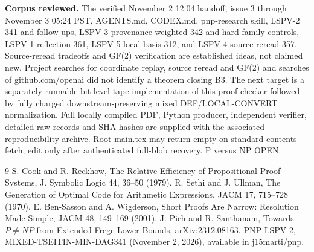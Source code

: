 \documentclass[11pt]{article}
\begin{document}
\noindent\textbf{Corpus reviewed.} The verified November 2 12:04 handoff, issue 3 through November 3 05:24 PST, AGENTS.md, CODEX.md, pnp-research skill, LSPV-2 341 and follow-ups, LSPV-3 provenance-weighted 342 and hard-family controls, LSPV-1 reflection 361, LSPV-5 local basis 312, and LSPV-4 source reread 357. Source-reread tradeoffs and GF(2) verification are established ideas, not claimed new. Project searches for coordinate replay, source reread and GF(2) and searches of github.com/openai did not identify a theorem closing B3. The next target is a separately runnable bit-level tape implementation of this proof checker followed by fully charged downstream-preserving mixed DEF/LOCAL-CONVERT normalization. Full locally compiled PDF, Python producer, independent verifier, detailed raw records and SHA hashes are supplied with the associated reproducibility archive. Root main.tex may return empty on standard contents fetch; edit only after authenticated full-blob recovery. P versus NP OPEN.

\begin{thebibliography}{9}
 S. Cook and R. Reckhow, The Relative Efficiency of Propositional Proof Systems, J. Symbolic Logic 44, 36--50 (1979).
 R. Sethi and J. Ullman, The Generation of Optimal Code for Arithmetic Expressions, JACM 17, 715--728 (1970).
 E. Ben-Sasson and A. Wigderson, Short Proofs Are Narrow: Resolution Made Simple, JACM 48, 149--169 (2001).
 J. Pich and R. Santhanam, Towards $P\ne NP$ from Extended Frege Lower Bounds, arXiv:2312.08163.
 PNP LSPV-2, MIXED-TSEITIN-MIN-DAG341 (November 2, 2026), available in j15marti/pnp.
\end{thebibliography}
\end{document}
